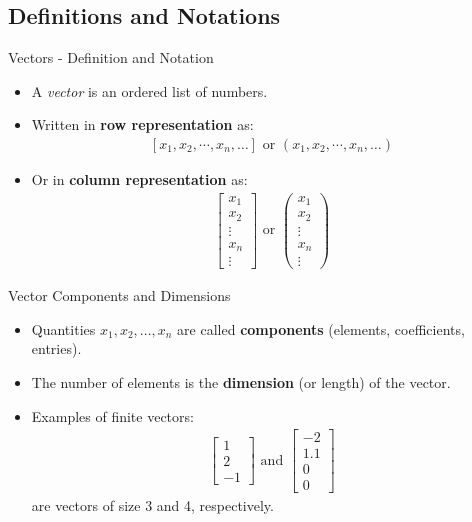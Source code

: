\subsection{Definitions and Notations}

\begin{frame}{Vectors - Definition and Notation}
    \begin{itemize}
        \item A \textit{vector} is an ordered list of numbers.
        \item Written in \textbf{row representation} as:
        \begin{align}
            \left[ x_1, x_2, \cdots, x_n, \ldots \right] \text{ or } \left( x_1, x_2, \cdots, x_n, \ldots \right) \label{eq:row}
        \end{align} 
        \item Or in \textbf{column representation} as:
        \begin{align}
            \begin{bmatrix}
                x_1 \\ x_2 \\ \vdots \\ x_n \\ \vdots
            \end{bmatrix} \text{ or }
            \begin{pmatrix}
                x_1 \\ x_2 \\ \vdots \\ x_n \\ \vdots
            \end{pmatrix} \label{eq:column}
        \end{align}
    \end{itemize}
\end{frame}

\begin{frame}{Vector Components and Dimensions}
    \begin{itemize}
        \item Quantities $x_1, x_2, \ldots, x_n$ are called \textbf{components} (elements, coefficients, entries).
        \item The number of elements is the \textbf{dimension} (or length) of the vector.
        \item Examples of finite vectors:
        \begin{align}
            \begin{bmatrix} 1 \\ 2 \\ -1 \end{bmatrix} \text{ and }
            \begin{bmatrix} -2 \\ 1.1 \\ 0 \\ 0 \end{bmatrix} \label{eq:examples}
        \end{align}
        are vectors of size 3 and 4, respectively.
    \end{itemize}
\end{frame}

